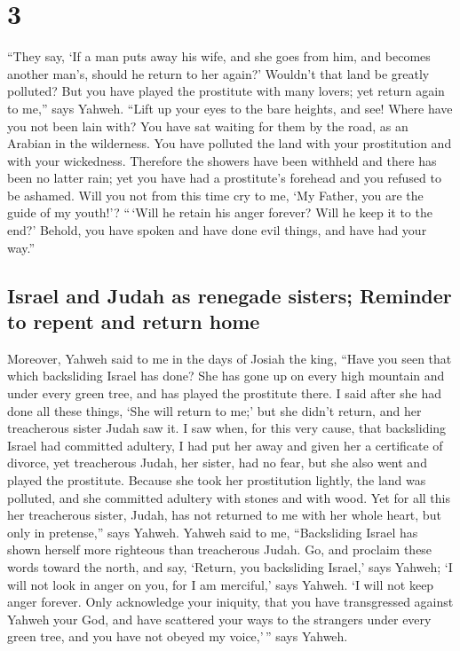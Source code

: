 \hypertarget{section-2}{%
\section{3}\label{section-2}}

 ``They say, `If a man puts away his wife, and she goes
from him, and becomes another man's, should he return to her again?'
Wouldn't that land be greatly polluted? But you have played the
prostitute with many lovers; yet return again to me,'' says Yahweh.
 ``Lift up your eyes to the bare heights, and see! Where
have you not been lain with? You have sat waiting for them by the road,
as an Arabian in the wilderness. You have polluted the land with your
prostitution and with your wickedness.  Therefore the
showers have been withheld and there has been no latter rain; yet you
have had a prostitute's forehead and you refused to be ashamed.
 Will you not from this time cry to me, `My Father, you
are the guide of my youth!'?  ``\,`Will he retain his
anger forever? Will he keep it to the end?' Behold, you have spoken and
have done evil things, and have had your way.''

\hypertarget{israel-and-judah-as-renegade-sisters-reminder-to-repent-and-return-home}{%
\subsection{Israel and Judah as renegade sisters; Reminder to repent and
return
home}\label{israel-and-judah-as-renegade-sisters-reminder-to-repent-and-return-home}}

 Moreover, Yahweh said to me in the days of Josiah the
king, ``Have you seen that which backsliding Israel has done? She has
gone up on every high mountain and under every green tree, and has
played the prostitute there.  I said after she had done
all these things, `She will return to me;' but she didn't return, and
her treacherous sister Judah saw it.  I saw when, for this
very cause, that backsliding Israel had committed adultery, I had put
her away and given her a certificate of divorce, yet treacherous Judah,
her sister, had no fear, but she also went and played the prostitute.
 Because she took her prostitution lightly, the land was
polluted, and she committed adultery with stones and with wood.
 Yet for all this her treacherous sister, Judah, has not
returned to me with her whole heart, but only in pretense,'' says
Yahweh.  Yahweh said to me, ``Backsliding Israel has
shown herself more righteous than treacherous Judah.  Go,
and proclaim these words toward the north, and say, `Return, you
backsliding Israel,' says Yahweh; `I will not look in anger on you, for
I am merciful,' says Yahweh. `I will not keep anger forever.
 Only acknowledge your iniquity, that you have
transgressed against Yahweh your God, and have scattered your ways to
the strangers under every green tree, and you have not obeyed my
voice,'\,'' says Yahweh.


